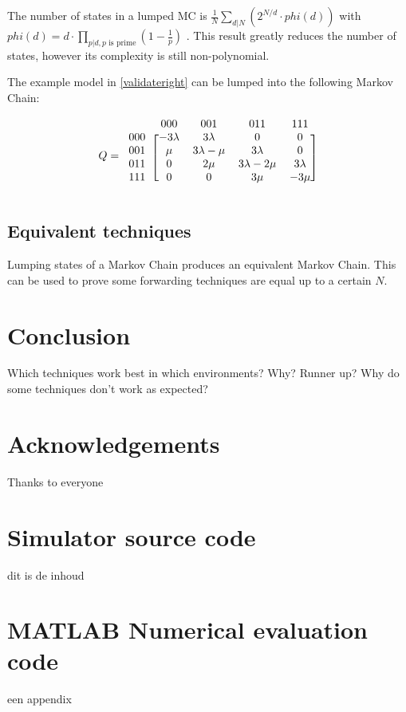 \documentclass[10pt,a4paper,titlepage]{article}
\begin{document}
The number of states in a lumped MC is $\frac{1}{N} \sum_{d|N} (2^{N/d} \cdot phi(d) )$ with $phi(d) = d \cdot \prod_{p|d, p\text{ is prime}} (1-\frac{1}{p})$ \cite{A000031}. This result greatly reduces the number of states, however its complexity is still non-polynomial.

The example model in \ref{validateright} can be lumped into the following Markov Chain:

\[ Q =
  \begin{blockarray}{ccccc}
    & 000 & 001 & 011 & 111 \\
    \begin{block}{c[cccc]}
    000 & -3\lambda & 3\lambda & 0 & 0 \\
    001 & \mu & 3\lambda-\mu & 3\lambda & 0 \\
    011 & 0 & 2\mu & 3\lambda-2\mu & 3\lambda \\
    111 & 0 & 0 & 3\mu & -3\mu \\
    \end{block}
  \end{blockarray}
\]



\subsection{Equivalent techniques}
Lumping states of a Markov Chain produces an equivalent Markov Chain. This can be used to prove some forwarding techniques are equal up to a certain $N$.

\section{Conclusion}
Which techniques work best in which environments? Why? Runner up? Why do some techniques don't work as expected?

\section*{Acknowledgements}
Thanks to everyone

\printbibliography

\appendix
\section{Simulator source code}
\label{sourcecode}
dit is de inhoud

\section{MATLAB Numerical evaluation code}
\label{matlabcode}
een appendix
\end{document}
